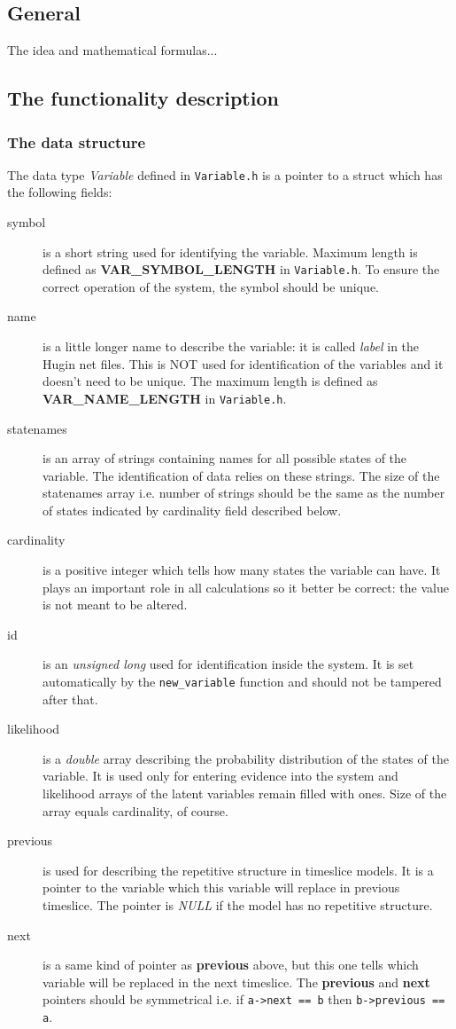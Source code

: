 \documentclass[12pt,a4paper]{report}
\begin{document}
\subsection{General}

The idea and mathematical formulas...

\subsection{The functionality description}

\subsubsection{The data structure}
The data type {\it Variable} defined in \verb+Variable.h+ is a pointer 
to a struct which has the following fields: 
\begin{description}
\item[symbol] is a short string used for identifying the variable. Maximum
length is defined as \textbf{VAR\_SYMBOL\_LENGTH} in
\verb+Variable.h+. To ensure the correct operation of the system, the 
symbol should be unique.
\item[name] is a little longer name to describe the variable: it is
called {\it label} in the Hugin net files. This is NOT used for 
identification of the variables and it doesn't need to be unique. 
The maximum length is defined as \textbf{VAR\_NAME\_LENGTH} in 
\verb+Variable.h+.
\item[statenames] is an array of strings containing names for all
possible states of the variable. The identification of data relies on
these strings. The size of the statenames array i.e. number of
strings should be the same as the number of states indicated by
cardinality field described below.
\item[cardinality] is a positive integer which tells how many states
the variable can have. It plays an important role in all calculations
so it better be correct: the value is not meant to be altered.
\item[id] is an {\it unsigned long} used for identification inside the
system. It is set automatically by the \verb+new_variable+ function
and should not be tampered after that.
\item[likelihood] is a {\it double} array describing the probability
distribution of the states of the variable. It is used only for
entering evidence into the system and likelihood arrays of the latent
variables remain filled with ones. Size of the array equals
cardinality, of course.
\item[previous] is used for describing the repetitive structure in
timeslice models. It is a pointer to the variable which this variable
will replace in previous timeslice. The pointer is {\it NULL} if the
model has no repetitive structure.
\item[next] is a same kind of pointer as \textbf{previous} above, but
this one tells which variable will be replaced in the next timeslice.
The \textbf{previous} and \textbf{next} pointers should be symmetrical
i.e. if \verb+a->next == b+ then \verb+b->previous == a+.
\end{description}
\end{document}
